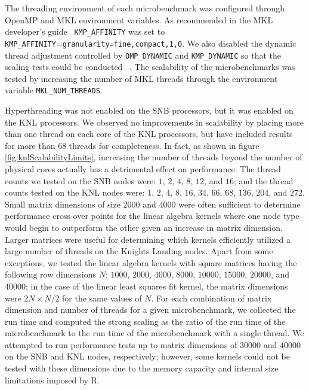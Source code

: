The threading environment of each microbenchmark was configured through OpenMP and MKL
environment variables. As recommended in the MKL developer's guide~\cite{intel:mkl2017}
\texttt{KMP\_AFFINITY} was set to \texttt{KMP\_AFFINITY}=\texttt{granularity=fine,compact,1,0}.
We also disabled the dynamic thread adjustment controlled by \texttt{OMP\_DYNAMIC} and
\texttt{KMP\_DYNAMIC} so that the scaling tests could be conducted ~\cite{intel:cpp2015,
intel:cpp2017, intel:mkl11_2, intel:mkl2017}. The scalability of the microbenchmarks was
tested by increasing the number of MKL threads through the environment variable
\texttt{MKL\_NUM\_THREADS}.

Hyperthreading was not enabled on the SNB processors, but it was enabled on the KNL
processors. We observed no improvements in scalability by placing more than one thread on
each core of the KNL processors, but have included results for more than 68 threads for
completeness. In fact, as shown in figure \ref{fig:knlScalabilityLimits}, increasing the
number of threads beyond the number of physical cores actually has a detrimental effect on
performance. The thread counts we tested on the SNB nodes were: $1$, $2$, $4$, $8$, $12$, and
$16$; and the thread counts tested on the KNL nodes were: $1$, $2$, $4$, $8$, $16$, $34$,
$66$, $68$, $136$, $204$, and $272$. Small matrix dimensions of size $2000$ and $4000$
were often sufficient to determine performance cross over points for the linear algebra
kernels where one node type would begin to outperform the other given an increase in
matrix dimension. Larger matrices were useful for determining which kernels efficiently
utilized a large number of threads on the Knights Landing nodes. Apart from some
exceptions, we tested the linear algebra kernels with square matrices having the following
row dimensions $N$: $1000$, $2000$, $4000$, $8000$, $10000$, $15000$, $20000$, and
$40000$; in the case of the linear least squares fit kernel, the matrix dimensions were
$2N \times N/2$ for the same values of $N$. For each combination of matrix dimension and
number of threads for a given microbenchmark, we collected the run time and computed the
strong scaling as the ratio of the run time of the microbenchmark to the run time of the
microbenchmark with a single thread. We attempted to run performance tests up to matrix
dimensions of $30000$ and $40000$ on the SNB and KNL nodes,
respectively; however, some kernels could not be tested with these dimensions due to the
memory capacity and internal size limitations imposed by R.

